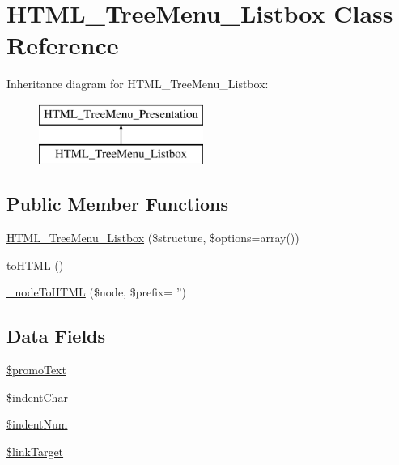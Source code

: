 \hypertarget{class_h_t_m_l___tree_menu___listbox}{\section{\-H\-T\-M\-L\-\_\-\-Tree\-Menu\-\_\-\-Listbox \-Class \-Reference}
\label{class_h_t_m_l___tree_menu___listbox}
}
\-Inheritance diagram for \-H\-T\-M\-L\-\_\-\-Tree\-Menu\-\_\-\-Listbox\-:\begin{figure}[H]
\begin{center}
\leavevmode
\includegraphics[height=2.000000cm]{class_h_t_m_l___tree_menu___listbox}
\end{center}
\end{figure}
\subsection*{\-Public \-Member \-Functions}
\begin{DoxyCompactItemize}
\item 
\hyperlink{class_h_t_m_l___tree_menu___listbox_a860ad5873c2d3cfd6e3f395b35baa1a6}{\-H\-T\-M\-L\-\_\-\-Tree\-Menu\-\_\-\-Listbox} (\$structure, \$options=array())
\item 
\hyperlink{class_h_t_m_l___tree_menu___listbox_abe9ad8cdef2c26dc57fe2b0cfaa8785b}{to\-H\-T\-M\-L} ()
\item 
\hyperlink{class_h_t_m_l___tree_menu___listbox_add594e3f86cd6287951e45b981b773c4}{\-\_\-node\-To\-H\-T\-M\-L} (\$node, \$prefix= '')
\end{DoxyCompactItemize}
\subsection*{\-Data \-Fields}
\begin{DoxyCompactItemize}
\item 
\hyperlink{class_h_t_m_l___tree_menu___listbox_a8e2d8b376864d205f0cdec183774158b}{\$promo\-Text}
\item 
\hyperlink{class_h_t_m_l___tree_menu___listbox_afec16a23b175cab08a54c75f1f7f046a}{\$indent\-Char}
\item 
\hyperlink{class_h_t_m_l___tree_menu___listbox_a83d5d7afb5bef6011b4c7151fc5a1e2a}{\$indent\-Num}
\item 
\hyperlink{class_h_t_m_l___tree_menu___listbox_abc92a826d3c81eded7a4f7eac934f348}{\$link\-Target}
\end{DoxyCompactItemize}


